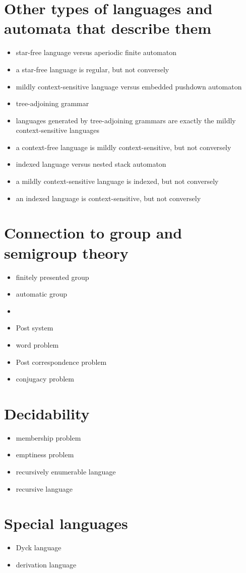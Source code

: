 \documentclass[12pt]{article}
\begin{document}
\section{Other types of languages and automata that describe them}
\begin{itemize}
\item star-free language versus aperiodic finite automaton
\item a star-free language is regular, but not conversely
\item mildly context-sensitive language versus embedded pushdown automaton
\item tree-adjoining grammar
\item languages generated by tree-adjoining grammars are exactly the mildly context-sensitive languages
\item a context-free language is mildly context-sensitive, but not conversely
\item indexed language versus nested stack automaton
\item a mildly context-sensitive language is indexed, but not conversely
\item an indexed language is context-sensitive, but not conversely
\end{itemize}

\section{Connection to group and semigroup theory}
\begin{itemize}
\item finitely presented group
\item automatic group
\item {}
\item Post system
\item word problem
\item Post correspondence problem
\item conjugacy problem
\end{itemize}

\section{Decidability}
\begin{itemize}
\item membership problem
\item emptiness problem
\item recursively enumerable language
\item recursive language
\end{itemize}

\section{Special languages}
\begin{itemize}
\item Dyck language
\item derivation language
\end{itemize}
\end{document}
